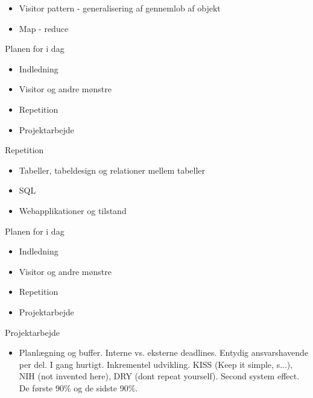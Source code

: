 \documentclass[a4paper,landscape]{slides}
\begin{document}
\begin{slide}
\begin{itemize}
       \item  Visitor pattern - generalisering af gennemlob af objekt
       \item  Map - reduce
\end{itemize} \end{slide} \begin{slide} \begin{center} {\large 
Planen for i dag
} \end{center} \begin{itemize} \addtolength{\itemsep}{-\baselineskip}
   \item Indledning
   \item Visitor og andre mønstre
   \item Repetition
   \item Projektarbejde
\end{itemize} \end{slide} \begin{slide} \begin{center} {\large 
    Repetition
} \end{center} \begin{itemize} \addtolength{\itemsep}{-\baselineskip}
       \item  Tabeller, tabeldesign og relationer mellem tabeller
       \item  SQL
       \item  Webapplikationer og tilstand
\end{itemize} \end{slide} \begin{slide} \begin{center} {\large 
Planen for i dag
} \end{center} \begin{itemize} \addtolength{\itemsep}{-\baselineskip}
   \item Indledning
   \item Visitor og andre mønstre
   \item Repetition
   \item Projektarbejde
\end{itemize} \end{slide} \begin{slide} \begin{center} {\large 
        Projektarbejde
} \end{center} \begin{itemize} \addtolength{\itemsep}{-\baselineskip}
   \item Planlægning og buffer. Interne vs. eksterne deadlines. Entydig ansvarshavende per del. I gang hurtigt. Inkrementel udvikling.  KISS (Keep it simple, s...), NIH (not invented here), DRY (dont repeat yourself). Second system effect. De første 90\% og de sidste 90\%.

\end{itemize}
\end{slide}
\end{document}
